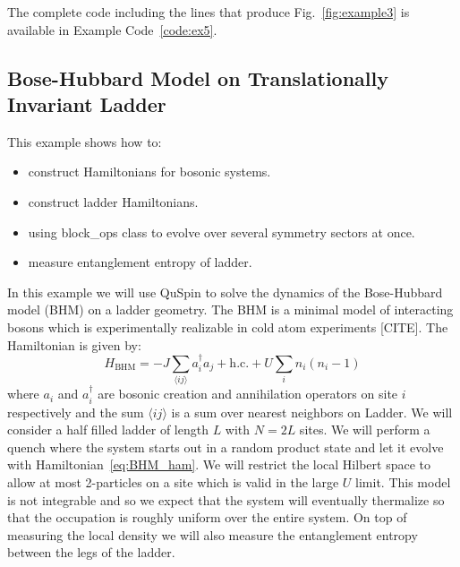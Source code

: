 \documentclass{SciPost}
\newcommand\0{\scalebox{-1}[1]{0}}
\begin{document}
The complete code including the lines that produce Fig.~\ref{fig:example3} is available in Example Code~\ref{code:ex5}.

\subsection{Bose-Hubbard Model on Translationally Invariant Ladder}
\label{subsec:Bose_Ladder}

This example shows how to:
\begin{itemize}
	\item construct Hamiltonians for bosonic systems.
	\item construct ladder Hamiltonians.
	\item using block\_ops class to evolve over several symmetry sectors at once.
	\item measure entanglement entropy of ladder.
\end{itemize}

 In this example we will use QuSpin to solve the dynamics of the Bose-Hubbard model (BHM) on a ladder geometry. The BHM is a minimal model of interacting bosons which is experimentally realizable in cold atom experiments [CITE]. The Hamiltonian is given by:
\begin{equation}
	H_\mathrm{BHM} = -J\sum_{\langle ij\rangle} a_i^\dagger a_j + \mathrm{h.c.} + U\sum_{i}n_i(n_i-1)\label{eq:BHM_ham}
\end{equation} 
where $a_i$ and $a^\dagger_i$ are bosonic creation and annihilation operators on site $i$ respectively and the sum $\langle ij\rangle$ is a sum over nearest neighbors on Ladder. We will consider a half filled ladder of length $L$ with $N=2L$ sites. We will perform a quench where the system starts out in a random product state and let it evolve with Hamiltonian~\eqref{eq:BHM_ham}. We will restrict the local Hilbert space to allow at most 2-particles on a site which is valid in the large $U$ limit. This model is not integrable and so we expect that the system will eventually thermalize so that the occupation is roughly uniform over the entire system. On top of measuring the local density we will also measure the entanglement entropy between the legs of the ladder.
\end{document}
